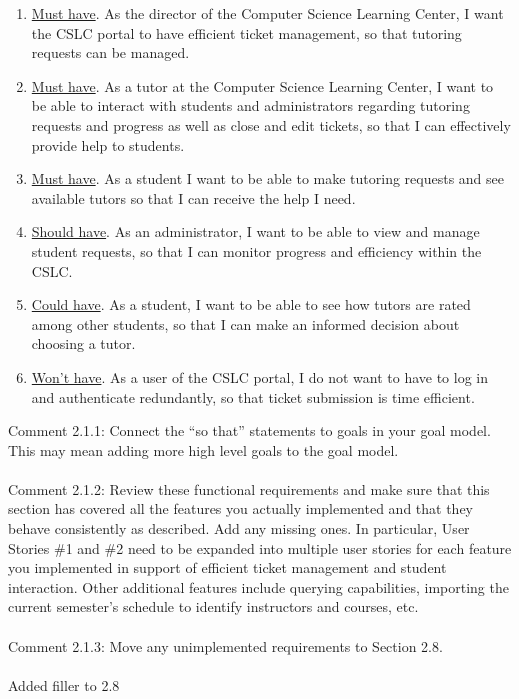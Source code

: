 \documentclass[oneside,openany,obeyspaces]{book}
\newcommand\tab[1][1cm]{\hspace*{#1}}
\begin{document}
\begin{flushleft}
    \begin{enumerate}
        \item \underline{Must have}. As the director of the Computer Science Learning Center, I want the CSLC portal to have efficient ticket management, so that tutoring requests can be managed.
        \item \underline{Must have}. As a tutor at the Computer Science Learning Center, I want to be able to interact with students and administrators regarding tutoring requests and progress as well as close and edit tickets, so that I can effectively provide help to students.
        \item \underline{Must have}. As a student I want to be able to make tutoring requests and see available tutors so that I can receive the help I need.
        \item \underline{Should have}. As an administrator, I want to be able to view and manage student requests, so that I can monitor progress and efficiency within the CSLC.
        \item \underline{Could have}. As a student, I want to be able to see how tutors are rated among other students, so that I can make an informed decision about choosing a tutor.
        \item \underline{Won't have}. As a user of the CSLC portal, I do not want to have to log in and authenticate redundantly, so that ticket submission is time efficient.
    \end{enumerate}
    {\color{red}Comment 2.1.1:	Connect the “so that” statements to goals in your goal model. This may mean adding more high level goals to the goal model.\\~\\}
    {\color{red}Comment 2.1.2:	Review these functional requirements and make sure that this section has covered all the features you actually implemented and that they behave consistently as described. Add any missing ones. In particular, User Stories \#1 and \#2 need to be expanded into multiple user stories for each feature you implemented in support of efficient ticket management and student interaction. Other additional features include querying capabilities, importing the current semester's schedule to identify instructors and courses, etc. \\~\\}
    {\color{red}Comment 2.1.3:	Move any unimplemented requirements to Section 2.8.\\~\\}
    {\color{blue}\tab Added filler to 2.8\\~\\}


\end{flushleft}
\end{document}
